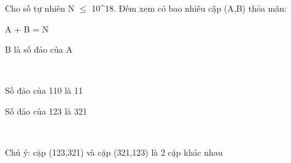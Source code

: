 Cho số tự nhiên N  $\le$  10^18. Đếm xem có bao nhiêu cặp (A,B) thỏa mãn:

A + B = N

B là số đảo của A

 

Số đảo của 110 là 11

Số đảo của 123 là 321

 

Chú ý: cặp (123,321) và cặp (321,123) là 2 cặp khác nhau